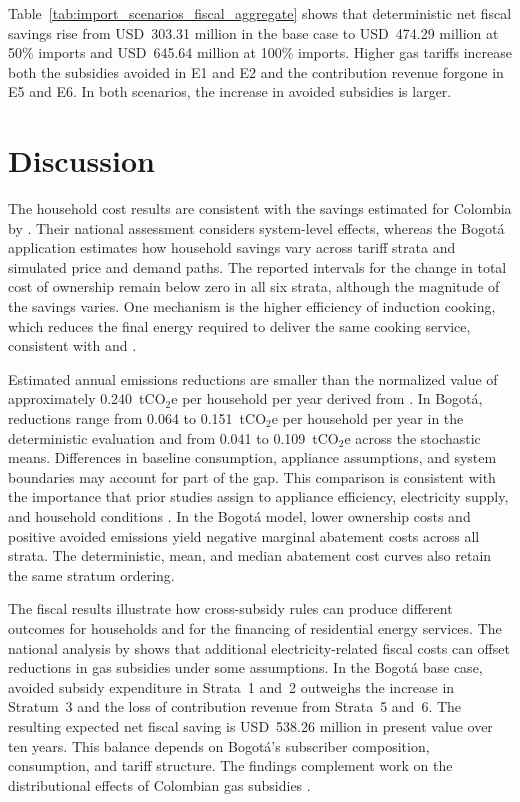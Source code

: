 \documentclass[authoryear,preprint,review,10pt]{elsarticle}
\begin{document}
Table~\ref{tab:import_scenarios_fiscal_aggregate} shows that deterministic net fiscal savings rise from USD~303.31 million in the base case to USD~474.29 million at 50\% imports and USD~645.64 million at 100\% imports. Higher gas tariffs increase both the subsidies avoided in E1 and E2 and the contribution revenue forgone in E5 and E6. In both scenarios, the increase in avoided subsidies is larger.

\section{Discussion}
\label{discussion}

The household cost results are consistent with the savings estimated for Colombia by \citet{cabrales2023costos}. Their national assessment considers system-level effects, whereas the Bogotá application estimates how household savings vary across tariff strata and simulated price and demand paths. The reported intervals for the change in total cost of ownership remain below zero in all six strata, although the magnitude of the savings varies. One mechanism is the higher efficiency of induction cooking, which reduces the final energy required to deliver the same cooking service, consistent with \citet{im2020} and \citet{scott2024energy}.

Estimated annual emissions reductions are smaller than the normalized value of approximately 0.240~tCO$_2$e per household per year derived from \citet{cabrales2023costos}. In Bogotá, reductions range from 0.064 to 0.151~tCO$_2$e per household per year in the deterministic evaluation and from 0.041 to 0.109~tCO$_2$e across the stochastic means. Differences in baseline consumption, appliance assumptions, and system boundaries may account for part of the gap. This comparison is consistent with the importance that prior studies assign to appliance efficiency, electricity supply, and household conditions \citep{scott2024energy,im2020,floess2023}. In the Bogotá model, lower ownership costs and positive avoided emissions yield negative marginal abatement costs across all strata. The deterministic, mean, and median abatement cost curves also retain the same stratum ordering.

The fiscal results illustrate how cross-subsidy rules can produce different outcomes for households and for the financing of residential energy services. The national analysis by \citet{cabrales2023costos} shows that additional electricity-related fiscal costs can offset reductions in gas subsidies under some assumptions. In the Bogotá base case, avoided subsidy expenditure in Strata~1 and~2 outweighs the increase in Stratum~3 and the loss of contribution revenue from Strata~5 and~6. The resulting expected net fiscal saving is USD~538.26 million in present value over ten years. This balance depends on Bogotá's subscriber composition, consumption, and tariff structure. The findings complement work on the distributional effects of Colombian gas subsidies \citep{cabrales2025subsidios_gas}.
\end{document}
